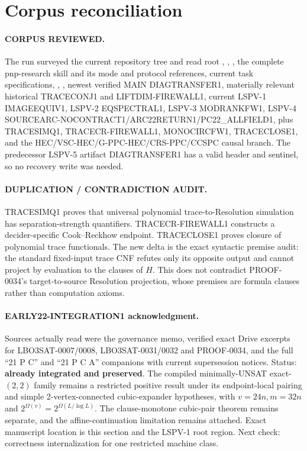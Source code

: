 \documentclass[11pt]{article}
\begin{document}
\section{Corpus reconciliation}
\paragraph{CORPUS REVIEWED.}
The run surveyed the current repository tree and read root ,
, , the complete pnp-research skill and its mode
and protocol references, current task specifications, ,
, newest verified MAIN DIAGTRANSFER1, materially relevant
historical TRACECONJ1 and LIFTDIM-FIREWALL1, current LSPV-1 IMAGEEQUIV1,
LSPV-2 EQSPECTRAL1, LSPV-3 MODRANKFW1, LSPV-4
SOURCEARC-NOCONTRACT1/ARC22RETURN1/PC22\_ALLFIELD1, plus TRACESIMQ1,
TRACECR-FIREWALL1, MONOCIRCFW1, TRACECLOSE1, and the
HEC/VSC-HEC/G-PPC-HEC/CRS-PPC/CCSPC causal branch.  The predecessor LSPV-5
artifact DIAGTRANSFER1 has a valid header and sentinel, so no recovery write
was needed.

\paragraph{DUPLICATION / CONTRADICTION AUDIT.}
TRACESIMQ1 proves that universal polynomial trace-to-Resolution simulation
has separation-strength quantifiers.  TRACECR-FIREWALL1 constructs a
decider-specific Cook--Reckhow endpoint.  TRACECLOSE1 proves closure of
polynomial trace functionals.  The new delta is the exact syntactic premise
audit: the standard fixed-input trace CNF refutes only its opposite output and
cannot project by evaluation to the clauses of \(H\).  This does not
contradict PROOF-0034's target-to-source Resolution projection, whose premises
are formula clauses rather than computation axioms.

\paragraph{EARLY22-INTEGRATION1 acknowledgment.}
Sources actually read were the governance memo, verified exact Drive excerpts
for LBO3SAT-0007/0008, LBO3SAT-0031/0032 and PROOF-0034, and the full ``21 P
C'' and ``21 P C A'' companions with current supersession notices.  Status:
\textbf{already integrated and preserved}.  The compiled minimally-UNSAT
exact-\((2,2)\) family remains a restricted positive result under its
endpoint-local pairing and simple 2-vertex-connected cubic-expander
hypotheses, with \(v=24n,m=32n\) and
\(2^{\Omega(v)}=2^{\Omega(L/\log L)}\).  The clause-monotone cubic-pair theorem
remains separate, and the affine-continuation limitation remains attached.
Exact manuscript location is this section and the LSPV-1 root region.  Next
check: correctness internalization for one restricted machine class.
\end{document}
